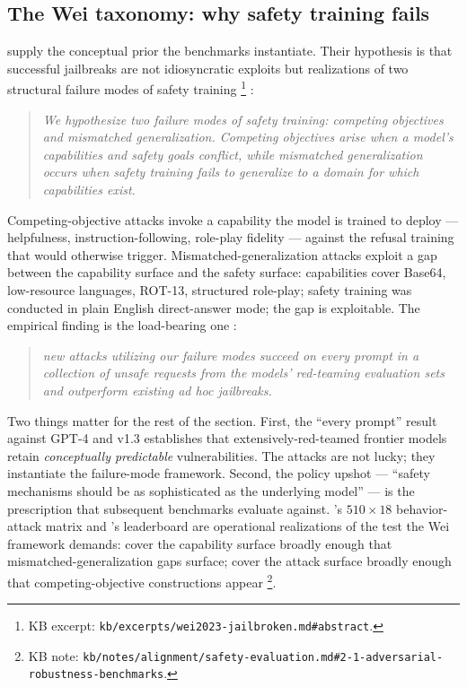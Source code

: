 \subsection{The Wei taxonomy: why safety training fails}
\label{sec:safety-wei}

\citet{wei2023-jailbroken} supply the conceptual prior the
benchmarks instantiate. Their hypothesis is that successful
jailbreaks are not idiosyncratic exploits but realizations of two
structural failure modes of safety training%
\footnote{KB excerpt: \texttt{kb/excerpts/wei2023-jailbroken.md\#abstract}.}
\citep[\S{}abstract]{wei2023-jailbroken}:

\begin{quote}\itshape
We hypothesize two failure modes of safety training: \emph{competing
objectives} and \emph{mismatched generalization}. Competing
objectives arise when a model's capabilities and safety goals
conflict, while mismatched generalization occurs when safety
training fails to generalize to a domain for which capabilities
exist.
\end{quote}

Competing-objective attacks invoke a capability the model is
trained to deploy --- helpfulness, instruction-following, role-play
fidelity --- against the refusal training that would otherwise
trigger. Mismatched-generalization attacks exploit a gap between
the capability surface and the safety surface: capabilities cover
Base64, low-resource languages, ROT-13, structured role-play; safety
training was conducted in plain English direct-answer mode; the gap
is exploitable. The empirical finding is the load-bearing one
\citep[\S{}abstract]{wei2023-jailbroken}:

\begin{quote}\itshape
new attacks utilizing our failure modes succeed on every prompt in
a collection of unsafe requests from the models' red-teaming
evaluation sets and outperform existing ad hoc jailbreaks.
\end{quote}

Two things matter for the rest of the section. First, the
``every prompt'' result against GPT-4 and  v1.3 establishes
that extensively-red-teamed frontier models retain
\emph{conceptually predictable} vulnerabilities. The attacks are
not lucky; they instantiate the failure-mode framework. Second,
the policy upshot --- ``safety mechanisms should be as sophisticated
as the underlying model''
\citep[\S{}abstract]{wei2023-jailbroken} --- is the
\emph{} prescription that subsequent
benchmarks evaluate against. 's $510 \times 18$ behavior-
attack matrix and 's leaderboard are operational
realizations of the test the Wei framework demands: cover the
capability surface broadly enough that mismatched-generalization
gaps surface; cover the attack surface broadly enough that
competing-objective constructions appear%
\footnote{KB note: \texttt{kb/notes/alignment/safety-evaluation.md\#2-1-adversarial-robustness-benchmarks}.}.


